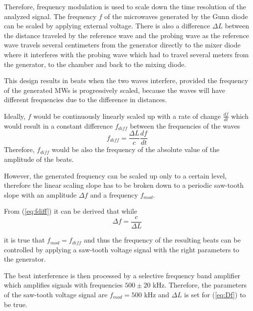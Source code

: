 \documentclass[a4paper,twoside]{articlek}
\begin{document}
Therefore, frequency modulation is used to scale down the time resolution of the analyzed signal. The frequency $f$ of the microwaves generated by the Gunn diode can be scaled by applying external voltage. There is also a difference $\Delta L$ between the distance traveled by the reference wave and the probing wave as the reference wave travels several centimeters from the generator directly to the mixer diode where it interferes with the probing wave which had to travel several meters from the generator, to the chamber and back to the mixing diode.

This design results in beats when the two waves interfere, provided the frequency of the generated MWs is progressively scaled, because the waves will have different frequencies due to the difference in distances. 

Ideally, $f$ would be continuously linearly scaled up with a rate of change $\frac{df}{dt}$ which would result in a constant difference $f_{diff}$ between the frequencies of the waves 
\begin{equation}
f_{diff}=\frac{\Delta L}{c} \frac{df}{dt}
\label{eq:fdiff}
\end{equation}
 Therefore, $f_{diff}$ would be also the frequency of the absolute value of the amplitude of the beats.

However, the generated frequency can be scaled up only to a certain level, therefore the linear scaling slope has to be broken down to a periodic saw-tooth slope with an amplitude $\Delta f$ and a frequency $f_{mod}$.

From (\ref{eq:fdiff}) it can be derived that while 
\begin{equation}
\Delta f=\frac{c}{\Delta L}
\label{eq:Df}
\end{equation}

it is true that $f_{mod}=f_{diff}$ and thus the frequency of the resulting beats can be controlled by applying a saw-tooth voltage signal with the right parameters to the generator. 

The beat interference is then processed by a selective frequency band amplifier which amplifies signals with frequencies $500 \pm 20$ kHz. Therefore, the parameters of the saw-tooth voltage signal are $f_{mod}=500$ kHz and $\Delta L$ is set for (\ref{eq:Df}) to be true.
\end{document}
